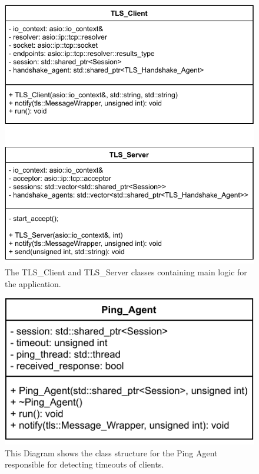 \documentclass[12pt, letterpaper]{article}
\begin{document}
\begin{figure}[H]
	\centering
	\includegraphics[width=.7\textwidth]{UML/ClientServer}
	\caption{The TLS\_Client and TLS\_Server classes containing main logic for the application.}
	\label{fig:ClientServer}
\end{figure}

\begin{figure}[H]
	\centering
	\includegraphics[width=.7\textwidth]{UML/PingAgent}
	\caption{This Diagram shows the class structure for the Ping Agent responsible for detecting timeouts of clients.}
	\label{fig:PingAgent}
\end{figure}
\end{document}
